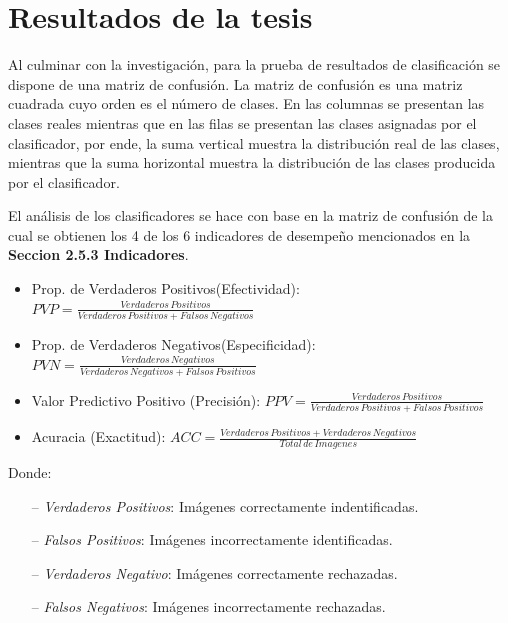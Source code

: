 \chapter{Resultados de la tesis}
\setcounter{page}{127}
\renewcommand{\baselinestretch}{1.2} %
	
	Al culminar con la investigación, para la prueba de resultados de clasificación se dispone de una matriz de confusión. La matriz de confusión es una matriz cuadrada cuyo orden es el número de clases. En las  columnas se presentan las clases reales mientras que en las filas se presentan las clases asignadas por el clasificador, por ende, la suma vertical muestra la distribución real de las clases, mientras que la suma horizontal muestra la distribución de las clases producida por el clasificador.

	El análisis de los clasificadores se hace con base en la matriz de confusión de la cual se obtienen los 4 de los 6 indicadores de desempeño mencionados en la \textbf{Seccion 2.5.3 Indicadores}.

	\begin{itemize}

	\item Prop. de Verdaderos Positivos(Efectividad): {$PVP= \frac{Verdaderos\,Positivos}{{Verdaderos\,Positivos} + {Falsos\,Negativos}}$}
	\item Prop. de Verdaderos Negativos(Especificidad): {$PVN= \frac{Verdaderos\,Negativos}{{Verdaderos\,Negativos} + {Falsos\,Positivos}}$}
	\item Valor Predictivo Positivo (Precisión): {$PPV = \frac{Verdaderos\,Positivos}{{Verdaderos\,Positivos}+{Falsos\,Positivos}}$}
	\item Acuracia (Exactitud): {$ACC= \frac{Verdaderos\,Positivos+Verdaderos\,Negativos}{Total\,de\,Imagenes}$}
	\end{itemize}	
	Donde:
	\begin{itemize}
		\item[--] \textit{Verdaderos Positivos}: Imágenes correctamente indentificadas.
		\item[--] \textit{Falsos Positivos}: Imágenes incorrectamente identificadas.
		\item[--] \textit{Verdaderos Negativo}: Imágenes correctamente rechazadas.
		\item[--] \textit{Falsos Negativos}: Imágenes incorrectamente rechazadas.
	\end{itemize}
	
